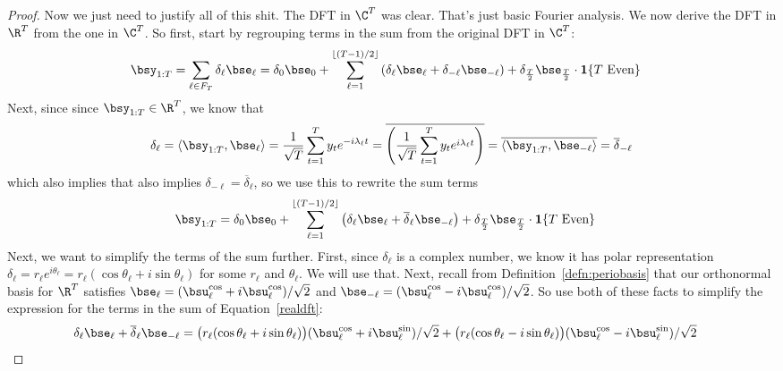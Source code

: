 \documentclass[12pt]{article}
\theoremstyle{plain}
\theoremstyle{definition}
\theoremstyle{remark}
\newcommand{\sumtT}{\sum^T_{t=1}}
\begin{document}
\begin{proof}
Now we just need to justify all of this shit.
The DFT in $\C^T$ was clear. That's just basic Fourier analysis. We now
derive the DFT in $\R^T$ from the one in $\C^T$.
So first, start by regrouping terms in the sum from the original DFT in
$\C^T$:
\begin{align*}
  \bsy_{1:T}
  = \sum_{\ell\in F_T} \delta_\ell \bse_\ell
  &=
  \delta_0 \bse_0
  +
  \sum_{\ell=1}^{\left\lfloor (T-1)/2 \right\rfloor}
  \left(
  \delta_\ell \bse_\ell
  +
  \delta_{-\ell} \bse_{-\ell}
  \right)
  + \delta_{\frac{T}{2}}\bse_{\frac{T}{2}}
    \cdot\mathbf{1}\{\text{$T$ Even}\}
\end{align*}
Next, since since $\bsy_{1:T}\in \R^T$, we know that
\begin{align*}
  \delta_\ell =
  \langle \bsy_{1:T}, \bse_\ell \rangle
  = \frac{1}{\sqrt{T}} \sumtT y_t e^{-i\lambda_\ell t}
  = \overline{%
      \left(\frac{1}{\sqrt{T}} \sumtT y_t e^{i\lambda_\ell t}\right)
    }
  = \overline{\langle \bsy_{1:T}, \bse_{-\ell} \rangle}
  = \overline{\delta}_{-\ell}
\end{align*}
which also implies that also implies
$\delta_{-\ell}=\overline{\delta}_\ell$, so we use this to rewrite the
sum terms
\begin{align}
  \bsy_{1:T}
  &=
  \delta_0 \bse_0
  +
  \sum_{\ell=1}^{\left\lfloor (T-1)/2 \right\rfloor}
  \left(
  \delta_\ell \bse_\ell
  +
  \overline{\delta}_{\ell} \bse_{-\ell}
  \right)
  + \delta_{\frac{T}{2}}\bse_{\frac{T}{2}}
    \cdot\mathbf{1}\{\text{$T$ Even}\}
  \label{realdft}
\end{align}
Next, we want to simplify the terms of the sum further.
First, since $\delta_\ell$ is a complex number, we know it has polar
representation $\delta_\ell = r_\ell e^{i\theta_\ell}
= r_\ell(\cos\theta_\ell+i\sin \theta_\ell)$ for some $r_\ell$ and
$\theta_\ell$. We will use that. Next, recall from
Definition~\ref{defn:periobasis} that our orthonormal basis for $\R^T$
satisfies
$\bse_\ell = (\bsu_\ell^{\cos}+i\bsu_\ell^{\cos})/\sqrt{2}$
and
$\bse_{-\ell} = (\bsu_\ell^{\cos}-i\bsu_\ell^{\cos})/\sqrt{2}$.
So use both of these facts to simplify the expression for the terms in
the sum of Equation~\ref{realdft}:
\begin{align*}
  \delta_\ell \bse_\ell
  +
  \overline{\delta}_{\ell} \bse_{-\ell}
  &=
  \big(r_\ell(\cos\theta_\ell+i\sin \theta_\ell)\big)
  (\bsu_\ell^{\cos} + i \bsu_\ell^{\sin})/ \sqrt{2}
  +
  \big(r_\ell(\cos\theta_\ell-i\sin \theta_\ell)\big)
  (\bsu_\ell^{\cos} - i \bsu_\ell^{\sin})/ \sqrt{2}

\end{align*}
\end{proof}
\end{document}

